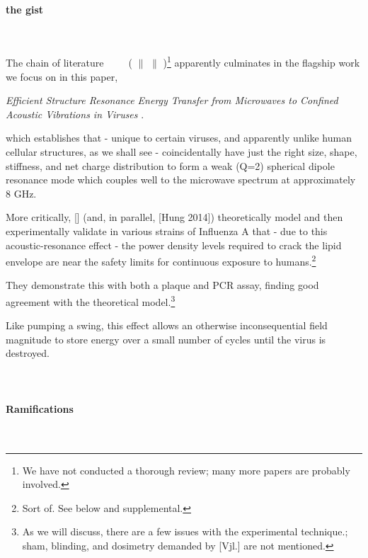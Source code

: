 \documentclass[fleqn,10pt]{article}
\begin{document}
\clearpage	
\begin{multicols}{1}




\paragraph{{\Large the gist}}\

The chain of literature 
%
\cite{Longrange1968} \textrightarrow \ \cite{Biological1980} \textrightarrow \ \cite{Microwave2009} \textrightarrow \ (\cite{focusing2014} $\parallel$ \cite{Efficient2015} $\parallel$ \cite{Resonant2017})\footnote{We have not conducted a thorough review; many more papers are probably involved.} apparently culminates in the flagship work we focus on in this paper,

{\it Efficient Structure Resonance Energy Transfer from Microwaves to Confined Acoustic Vibrations in Viruses} \cite{Efficient2015}.
%

which establishes that - unique to certain viruses, and apparently unlike human cellular structures, as we shall see - coincidentally have just the right size, shape, stiffness, and net charge distribution to form a weak (Q=2) spherical dipole resonance mode which couples well to the microwave spectrum at approximately 8 GHz.

More critically, [] (and, in parallel, [Hung 2014]) theoretically model and then experimentally validate in various strains of Influenza A that - due to this acoustic-resonance effect - the power density levels required to crack the lipid envelope are near the safety limits for continuous exposure to humans.\footnote{Sort of. See below and supplemental.}

They demonstrate this with both a plaque and PCR assay, finding good agreement with the theoretical model.\footnote{As we will discuss, there are a few issues with the experimental technique.; sham, blinding, and dosimetry demanded by [Vjl.] are not mentioned.}

Like pumping a swing, this effect allows an otherwise inconsequential field magnitude to store energy over a small number of cycles until the virus is destroyed. \\
\\\\

\paragraph{Ramifications}\


\end{multicols}
\end{document}
